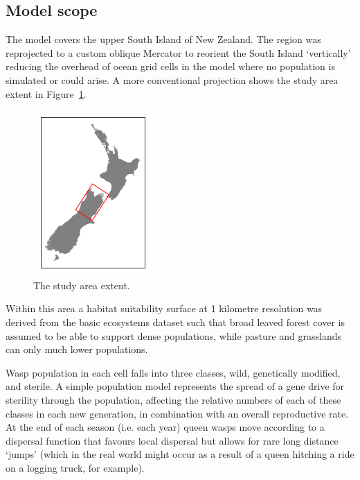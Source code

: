 \documentclass[11pt]{article}
\begin{document}
\subsection{Model scope}\label{sec:model-scope}
The model covers the upper South Island of New Zealand.
The region was reprojected to a custom oblique Mercator to reorient the South Island `vertically' reducing the overhead of ocean grid cells in the model where no population is simulated or could arise.
A more conventional projection shows the study area extent in Figure~\ref{fig:locator-map}.
\par
\begin{figure}
  \begin{center}
    \includegraphics{locator_map}
    \caption{The study area extent.}\label{fig:locator-map}
  \end{center}
\end{figure} %
Within this area a habitat suitability surface at 1 kilometre resolution was derived from the basic ecosystems dataset \citep{BarringerND} such that broad leaved forest cover is assumed to be able to support dense populations, while pasture and grasslands can only much lower populations.
\par
%
Wasp population in each cell falls into three classes, wild, genetically modified, and sterile.
A simple population model represents the spread of a gene drive for sterility through the population, affecting the relative numbers of each of these classes in each new generation, in combination with an overall reproductive rate.
At the end of each season (i.e. each year) queen wasps move according to a dispersal function that favours local dispersal but allows for rare long distance `jumps' (which in the real world might occur as a result of a queen hitching a ride on a logging truck, for example).
\par
\end{document}

